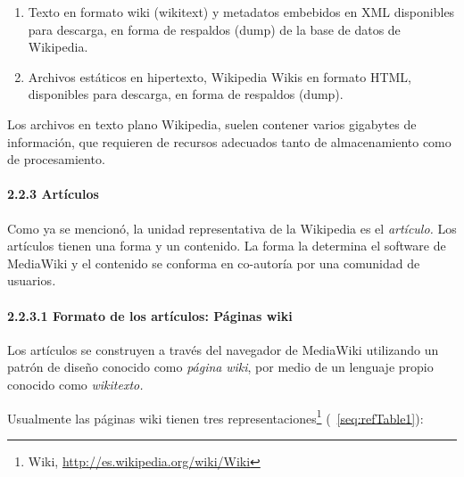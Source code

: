 \documentclass[letterpaper]{article}
\newcommand\liststyleLii{%
\renewcommand\theenumi{\arabic{enumi}}
\renewcommand\theenumii{\arabic{enumii}}
\renewcommand\theenumiii{\arabic{enumiii}}
\renewcommand\theenumiv{\arabic{enumiv}}
\renewcommand\labelenumi{\theenumi.}
\renewcommand\labelenumii{\theenumii.}
\renewcommand\labelenumiii{\theenumiii.}
\renewcommand\labelenumiv{\theenumiv.}
}
\begin{document}
\bigskip

\liststyleLii
\begin{enumerate}
\item {\sffamily
Texto en formato wiki (wikitext) y metadatos embebidos en XML
disponibles para descarga, en forma de respaldos (dump) de la base de
datos de Wikipedia.}
\item {\sffamily
Archivos est\'aticos en hipertexto, Wikipedia Wikis en formato HTML,
disponibles para descarga, en forma de respaldos (dump).}
\end{enumerate}

\bigskip

{\sffamily
Los archivos en texto plano Wikipedia, suelen contener varios gigabytes
de informaci\'on, que requieren de recursos adecuados tanto de
almacenamiento como de procesamiento.}


\bigskip

\paragraph{2.2.3 Art\'iculos}

\bigskip

{\sffamily
Como ya se mencion\'o, la unidad representativa de la Wikipedia es el
\textit{art\'iculo. }Los art\'iculos tienen una forma y un contenido.
La forma la determina el software de MediaWiki y el contenido se
conforma en co-autor\'ia por una comunidad de usuarios\textit{.}}


\bigskip

\paragraph{2.2.3.1 Formato de los art\'iculos: P\'aginas wiki}

\bigskip

{\sffamily
Los art\'iculos se construyen a trav\'es del navegador de MediaWiki
utilizando un patr\'on de dise\~no conocido como \textit{p\'agina}
\textit{wiki}, por medio de un lenguaje propio conocido como
\textit{wikitexto.}}

{\sffamily
Usualmente las p\'aginas wiki tienen tres
representaciones\footnote{Wiki,
\url{http://es.wikipedia.org/wiki/Wiki}}
(\tablename~\ref{seq:refTable1}):}


\bigskip
\end{document}
